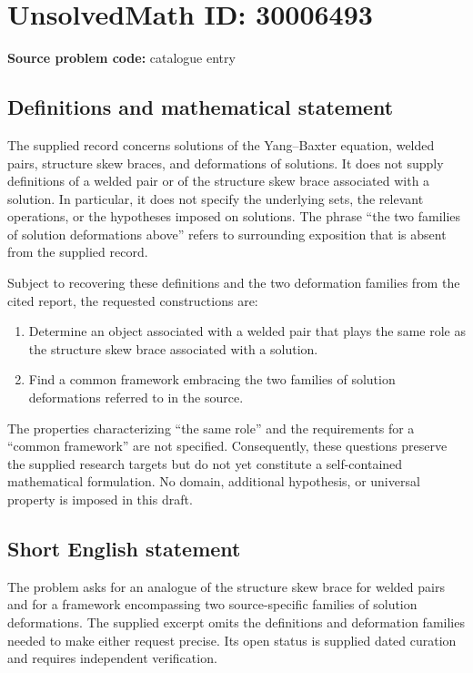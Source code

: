 \documentclass[11pt]{article}
\begin{document}
\section*{UnsolvedMath ID: 30006493}
\textbf{Source problem code:} catalogue entry
\subsection{Definitions and mathematical statement}
The supplied record concerns solutions of the Yang--Baxter equation, welded pairs, structure skew braces, and deformations of solutions. It does not supply definitions of a welded pair or of the structure skew brace associated with a solution. In particular, it does not specify the underlying sets, the relevant operations, or the hypotheses imposed on solutions. The phrase ``the two families of solution deformations above'' refers to surrounding exposition that is absent from the supplied record.

Subject to recovering these definitions and the two deformation families from the cited report, the requested constructions are:
\begin{enumerate}
\item Determine an object associated with a welded pair that plays the same role as the structure skew brace associated with a solution.
\item Find a common framework embracing the two families of solution deformations referred to in the source.
\end{enumerate}
The properties characterizing ``the same role'' and the requirements for a ``common framework'' are not specified. Consequently, these questions preserve the supplied research targets but do not yet constitute a self-contained mathematical formulation. No domain, additional hypothesis, or universal property is imposed in this draft.
\subsection{Short English statement}
The problem asks for an analogue of the structure skew brace for welded pairs and for a framework encompassing two source-specific families of solution deformations. The supplied excerpt omits the definitions and deformation families needed to make either request precise. Its open status is supplied dated curation and requires independent verification.
\end{document}
